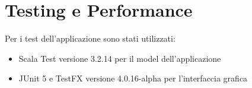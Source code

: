 \chapter{Testing e Performance}
Per i test dell'applicazione sono stati utilizzati:
\begin{itemize}
    \item Scala Test versione 3.2.14 per il model dell'applicazione
    \item JUnit 5 e TestFX versione 4.0.16-alpha per l'interfaccia grafica
\end{itemize}